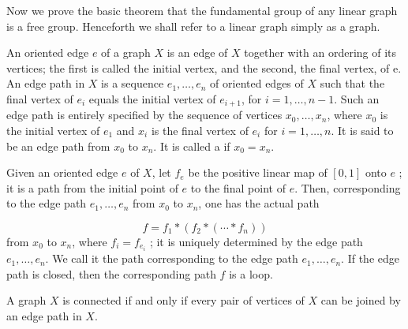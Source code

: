 Now we prove the basic theorem that the fundamental group of any linear graph is a free group. Henceforth we shall refer to a linear graph simply as a graph.

\begin{definition}
	An oriented edge \(e\) of a graph \(X\) is an edge of \(X\) together with an ordering of its vertices; the first is called the initial vertex, and the second, the final vertex, of e. An edge path in \(X\) is a sequence \(e_{1},\ldots ,e_{n}\) of oriented edges of \(X\) such that the final vertex of \(e_{i}\) equals the initial vertex of \(e_{i + 1}\), for \(i = 1,\ldots, n - 1\). Such an edge path is entirely specified by the sequence of vertices \(x_{0},\ldots ,x_{n}\), where \(x_{0}\) is the initial vertex of \(e_{1}\) and \(x_{i}\) is the final vertex of \(e_{i}\) for \(i = 1,\ldots, n\). It is said to be an edge path from \(x_{0}\) to \(x_{n}\). It is called a  if \(x_{0} = x_{n}\).
\end{definition}

Given an oriented edge \(e\) of \(X\), let \(f_{e}\) be the positive linear map of \([ {0,1}]\) onto \(e\) ; it is a path from the initial point of \(e\) to the final point of \(e\). Then, corresponding to the edge path \(e_{1},\ldots ,e_{n}\) from \(x_{0}\) to \(x_{n}\), one has the actual path

\[
f = f_{1} * ( {f_{2} * ( {\cdots * f_{n}}) })
\]
from \(x_{0}\) to \(x_{n}\), where \(f_{i} = f_{e_{i}}\) ; it is uniquely determined by the edge path \(e_{1},\ldots ,e_{n}\). We call it the path corresponding to the edge path \(e_{1},\ldots ,e_{n}\). If the edge path is closed, then the corresponding path \(f\) is a loop.

\begin{lemma}
\label{lem:\thetheorem}
	A graph \(X\) is connected if and only if every pair of vertices of \(X\) can be joined by an edge path in \(X\).
\end{lemma}

